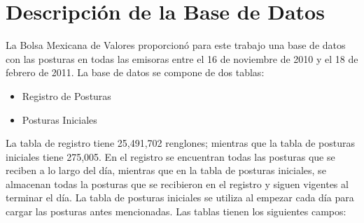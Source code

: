 \documentclass[11pt]{article}
\numberwithin{equation}{section} %
\begin{document}
\clearpage

\section{Descripción de la Base de Datos}
La Bolsa Mexicana de Valores proporcionó para este trabajo una base de datos con las posturas en todas las emisoras entre el 16 de noviembre de 2010 y el 18 de febrero de 2011. La base de datos se compone de dos tablas:

\begin{itemize}
  \item Registro de Posturas
  \item Posturas Iniciales
\end{itemize}

La tabla de registro tiene 25,491,702 renglones; mientras que la tabla de posturas iniciales tiene 275,005. En el registro se encuentran todas las posturas que se reciben a lo largo del día, mientras que en la tabla de posturas iniciales, se almacenan todas la posturas que se recibieron en el registro y siguen vigentes al terminar el día. La tabla de posturas iniciales se utiliza al empezar cada día para cargar las posturas antes mencionadas. Las tablas tienen los siguientes campos:\\
\end{document}
